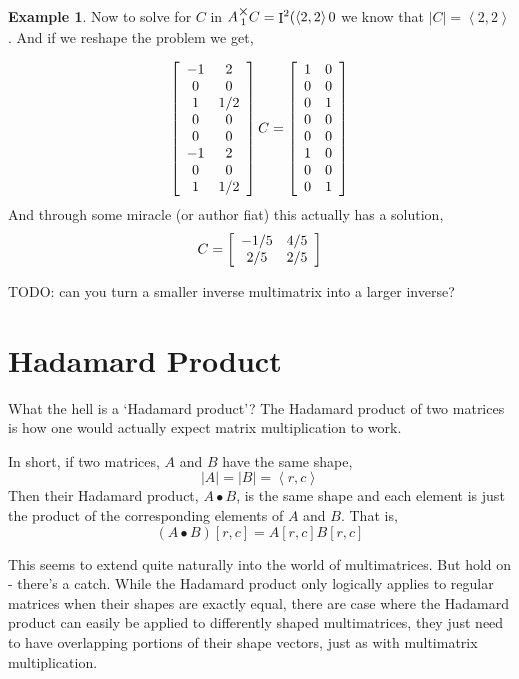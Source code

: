 \documentclass[12pt]{book}
\theoremstyle{plain}
\theoremstyle{definition}
\newtheorem{example}{Example}[chapter]
\theoremstyle{ppart}
\theoremstyle{case}
\theoremstyle{solution}
\DeclareMathOperator{\Ident}{I}
\newcommand{\mmult}[1]{\text{\raisebox{1ex}{$\underset{#1}{\times}$}}}
\newcommand{\shape}[1]{\left|#1\right|}
\begin{document}
\begin{example}
Now to solve for $C$ in $A \mmult{1} C = \Ident^2(\left<2,2\right>0$ we know
that $\shape{C} = \left<2,2\right>$.
And if we reshape the problem we get,

\[
\left[
  \begin{array}{c c}
    -1 & 2 \\
    0 & 0 \\
    1 & 1/2 \\
    0 & 0 \\
    0 & 0 \\
    -1 & 2 \\
    0 & 0 \\
    1 & 1/2 \\
  \end{array}
\right]
C
=
\left[
  \begin{array}{c c}
    1 & 0 \\
    0 & 0 \\
    0 & 1 \\
    0 & 0 \\
    0 & 0 \\
    1 & 0 \\
    0 & 0 \\
    0 & 1
  \end{array}
\right]
\]
And through some miracle (or author fiat) this actually has a solution,
\[
  C =
  \left[
    \begin{array}{c c}
      -1/5 & 4/5 \\
      2/5 & 2/5
    \end{array}
  \right]
\]
\end{example}

TODO: can you turn a smaller inverse multimatrix into a larger inverse?

\section{Hadamard Product}

What the hell is a `Hadamard product'? The Hadamard product \cite{wiki:hadamard}
of two matrices is how one would actually expect matrix multiplication to work.

In short, if two matrices, $A$ and $B$ have the same shape,
\[ \shape{A} = \shape{B} = \left<r,c\right> \]
Then their Hadamard product, $A \bullet B$, is the same shape and each element
is just the product of the corresponding elements of $A$ and $B$. That is,
\[ (A \bullet B)[r,c] = A[r,c] B[r,c] \]

This seems to extend quite naturally into the world of multimatrices.
But hold on - there's a catch. While the Hadamard product only logically applies
to regular matrices when their shapes are exactly equal, there are case where
the Hadamard product can easily be applied to differently shaped multimatrices,
they just need to have overlapping portions of their shape vectors, just as
with multimatrix multiplication.
\end{document}
